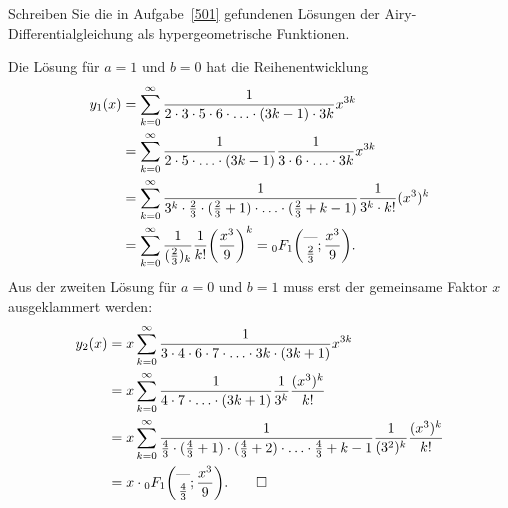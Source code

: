Schreiben Sie die in Aufgabe~\ref{501} gefundenen Lösungen der
Airy-Differentialgleichung als hypergeometrische Funktionen.

\begin{loesung}
Die Lösung für $a=1$ und $b=0$ hat die Reihenentwicklung
\begin{align*}
y_1(x)
&=
\sum_{k=0}^\infty
\frac{1}{2\cdot 3\cdot 5\cdot 6\cdot\ldots\cdot (3k-1)\cdot 3k}
x^{3k}
\\
&=
\sum_{k=0}^\infty
\frac{1}{2\cdot 5\cdot \ldots\cdot (3k-1)}
\frac{1}{3\cdot 6\cdot \ldots\cdot 3k}
x^{3k}
\\
&=
\sum_{k=0}^\infty
\frac{1}{3^k\cdot \frac23\cdot(\frac23+1)\cdot\ldots\cdot(\frac23+k-1)}
\frac{1}{3^k\cdot k!}
(x^3)^k
\\
&=
\sum_{k=0}^\infty
\frac{1}{(\frac23)_k} \frac{1}{k!}\biggl(\frac{x^3}{9}\biggr)^k
=
\mathstrut_0F_1\biggl(
\begin{matrix}\text{---}\\\frac23\end{matrix};\frac{x^3}{9}
\biggr).
\end{align*}
Aus der zweiten Lösung für $a=0$ und $b=1$ muss erst der gemeinsame
Faktor $x$ ausgeklammert werden:
\begin{align*}
y_2(x)
&=
x\sum_{k=0}^\infty
\frac{1}{3\cdot4\cdot 6\cdot 7\cdot\ldots\cdot 3k\cdot(3k+1)}x^{3k}
\\
&=
x\sum_{k=0}^\infty
\frac{1}{4\cdot 7\cdot\ldots\cdot (3k+1)}
\frac{1}{3^k}
\frac{(x^3)^k}{k!}
\\
&=
x\sum_{k=0}^\infty
\frac{1}{\frac43\cdot (\frac43+1)\cdot (\frac43+2)\cdot\ldots\cdot \frac43+k-1}
\frac{1}{(3^2)^k}
\frac{(x^3)^k}{k!}
\\
&=
x\cdot\mathstrut_0F_1\biggl(
\begin{matrix}\text{---}\\\frac43\end{matrix};
\frac{x^3}{9}
\biggr).
\qedhere
\end{align*}
\end{loesung}

